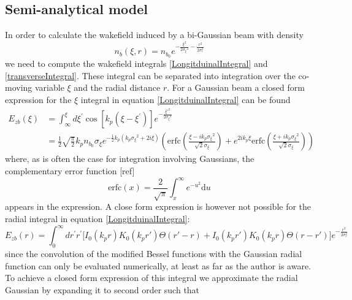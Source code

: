 \subsection{Semi-analytical model}
In order to calculate the wakefield induced by a bi-Gaussian beam with density
\begin{equation}
\label{BigaussianBeamDensity}
n_b(\xi,r)= n_{b_0}e^{-\frac{\xi ^2}{2 \sigma{_\xi}^2}-\frac{r ^2}{2 \sigma_r ^2}}
\end{equation}
we need to compute the wakefield integrals \ref{LongitduinalIntegral} and \ref{transverseIntegral}. These integral can be separated into integration over the co-moving variable $\xi$ and the radial distance $r$. For a Gaussian beam a closed form expression for the $\xi$ integral in equation \ref{LongitduinalIntegral} can be found
\begin{equation}
\label{Ezxi}
\begin{aligned}
E_{z b}(\xi)&= \int_{\infty}^{\xi} d \xi^{\prime} \cos \left[k_{p}\left(\xi-\xi^{\prime}\right)\right] e^{-\frac{\xi'^2}{2 \sigma{_\xi}^2}} \\
 &= \frac{1}{2} \sqrt{\frac{\pi }{2}} k_pn_{b_0} \sigma{_\xi}  e^{-\frac{1}{2} k_p \left(k_p\sigma{_\xi}^2+2 i \xi \right)}
   \left(\text{erfc}\left(\frac{\xi -i k_p\sigma{_\xi}^2}{\sqrt{2} \sigma{_\xi}}\right)+e^{2 i k_p\xi } \text{erfc}\left(\frac{\xi +i
   k_p\sigma{_\xi}^2}{\sqrt{2} \sigma{_\xi}}\right)\right)
   \end{aligned}
\end{equation}
where, as is often the case for integration involving Gaussians, the complementary error function [ref] 
\begin{equation}
\text{erfc}(x)=\frac{2}{\sqrt{\pi}} \int_{x}^{\infty} e^{-u^{2}} \mathrm{d}u
\end{equation}
appears in the expression. A close form expression is however not possible for the radial integral in equation \ref{LongitduinalIntegral}:
\begin{equation}
\label{Ezr}
 E_{z b}(r)=  \int_{0}^{\infty} d r^{\prime} r^{\prime}\Big[ I_{0}\left(k_{p} r\right) K_{0}\left(k_{p} r'\right)\Theta\left(r'-r\right)  +I_{0}\left(k_{p} r'\right) K_{0}\left(k_{p} r\right)\Theta\left(r-r'\right)     \Big]e^{-\frac{r ^2}{2 \sigma_r ^2}}
\end{equation}
since the convolution of the modified Bessel functions with the Gaussian radial function can only be evaluated numerically, at least as far as the author is aware. To achieve a closed form expression of this integral we approximate the radial Gaussian by expanding it to second order such that

